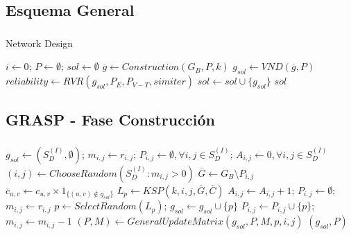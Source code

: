 \subsection{Esquema General}
\begin{frame}\frametitle{}
    \begin{block}{Network Design}
\begin{algorithm}[H]
\caption{$sol = NetworkDesign(G_B,iter,k,p_{min},P_E,P_{V-T},simiter)$}
\begin{algorithmic}[1]
\begin{small}    
\STATE $i \leftarrow 0; \, P \leftarrow \emptyset; \, sol \leftarrow \emptyset$
\STATE $\overline{g} \leftarrow Construction(G_B,P,k)$
\STATE $g_{sol} \leftarrow VND(\overline{g},P)$
\STATE $reliability \leftarrow RVR(g_{sol},P_E,P_{V-T},simiter)$
\STATE $sol \leftarrow sol \cup \{g_{sol}\}$
\ENDIF
\ENDWHILE
\RETURN $sol$
\end{small}
\end{algorithmic}
\end{algorithm}
    \end{block}
\end{frame}

\subsection{GRASP - Fase Construcción}
\begin{frame}\frametitle{}
    \begin{block}{}
\begin{algorithm}[H]
\caption{$(sol,P) = Construction(G_B,C,R,k)$}
\begin{algorithmic}[1]
\begin{scriptsize}
\STATE $g_{sol} \leftarrow (S_D^{(I)},\emptyset)$; $m_{i,j}\leftarrow r_{i,j}$; $P_{i,j}\leftarrow \emptyset, \forall i,j \in S_{D}^{(I)}$; $A_{i,j}\leftarrow 0, \forall i,j \in S_{D}^{(I)}$
\STATE $(i,j) \leftarrow ChooseRandom(S_{D}^{(I)}: m_{i,j}>0)$
\STATE $\overline{G} \leftarrow G_B \setminus P_{i,j}$
\STATE $\overline{c}_{u,v} \leftarrow c_{u,v} \times 1_{\{(u,v) \notin g_{sol}\}}$
\ENDFOR
\STATE $L_p \leftarrow KSP(k,i,j,\overline{G},\overline{C})$
\STATE $A_{i,j} \leftarrow A_{i,j}+1$; $P_{i,j} \leftarrow \emptyset$; $m_{i,j}\leftarrow r_{i,j}$ 
\ELSE 
\STATE $p \leftarrow SelectRandom(L_p)$; $g_{sol} \leftarrow g_{sol} \cup \{p\}$
\STATE $P_{i,j} \leftarrow P_{i,j} \cup \{p\}$; $m_{i,j} \leftarrow m_{i,j}-1$
\STATE $(P,M) \leftarrow GeneralUpdateMatrix(g_{sol},P,M,p,i,j)$
\ENDIF
\ENDWHILE
\RETURN $(g_{sol},P)$
\end{scriptsize}    
\end{algorithmic}
\end{algorithm}
\end{block}
\end{frame}

